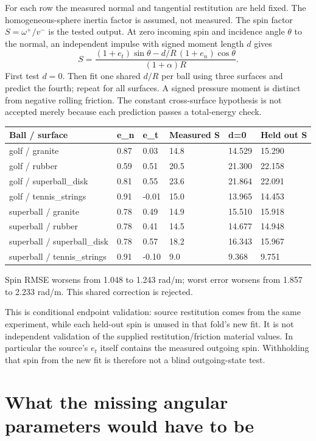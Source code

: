 \documentclass[10pt,a4paper]{article}
\begin{document}
For each row the measured normal and tangential restitution are held fixed. The
homogeneous-sphere inertia factor is assumed, not measured. The spin factor
$S=\omega^+/v^-$ is the tested output. At zero incoming spin and incidence angle
$\theta$ to the normal, an independent impulse with signed moment length $d$ gives
\[
 S=\frac{(1+e_t)\sin\theta-d/R\,(1+e_n)\cos\theta}{(1+\alpha)R}.
\]
First test $d=0$. Then fit one shared $d/R$ per ball using three surfaces and predict
the fourth; repeat for all surfaces. A signed pressure moment is distinct from
negative rolling friction. The constant cross-surface hypothesis is not accepted
merely because each prediction passes a total-energy check.
\begin{center}\footnotesize\setlength{\tabcolsep}{4pt}
\begin{tabular}{llllll}
\hline
Ball / surface & e\_n & e\_t & Measured S & d=0 & Held out S\\\hline
golf / granite & 0.87 & 0.03 & 14.8 & 14.529 & 15.290\\
golf / rubber & 0.59 & 0.51 & 20.5 & 21.300 & 22.158\\
golf / superball\_disk & 0.81 & 0.55 & 23.6 & 21.864 & 22.091\\
golf / tennis\_strings & 0.91 & -0.01 & 15.0 & 13.965 & 14.453\\
superball / granite & 0.78 & 0.49 & 14.9 & 15.510 & 15.918\\
superball / rubber & 0.78 & 0.41 & 14.5 & 14.677 & 14.948\\
superball / superball\_disk & 0.78 & 0.57 & 18.2 & 16.343 & 15.967\\
superball / tennis\_strings & 0.91 & -0.10 & 9.0 & 9.368 & 9.751\\
\hline\end{tabular}\end{center}Spin RMSE worsens from 1.048 to 1.243 rad/m; worst error worsens from 1.857 to 2.233 rad/m. This shared correction is rejected.


This is conditional endpoint validation: source restitution comes from the same
experiment, while each held-out spin is unused in that fold's new fit. It is not
independent validation of the supplied restitution/friction material values.
In particular the source's $e_t$ itself contains the measured outgoing spin.
Withholding that spin from the new fit is therefore not a blind outgoing-state test.

\newpage
\section*{What the missing angular parameters would have to be}
\end{document}
